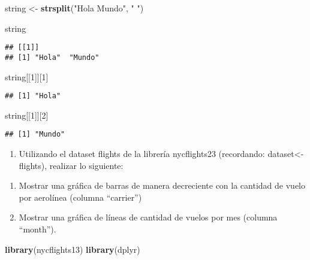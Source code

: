 \documentclass[
]{article}
\newenvironment{Shaded}{\begin{snugshade}}{\end{snugshade}}
\newcommand{\DecValTok}[1]{\textcolor[rgb]{0.00,0.00,0.81}{#1}}
\newcommand{\FunctionTok}[1]{\textcolor[rgb]{0.13,0.29,0.53}{\textbf{#1}}}
\newcommand{\NormalTok}[1]{#1}
\newcommand{\OtherTok}[1]{\textcolor[rgb]{0.56,0.35,0.01}{#1}}
\newcommand{\StringTok}[1]{\textcolor[rgb]{0.31,0.60,0.02}{#1}}
\providecommand{\tightlist}{%
  \setlength{\itemsep}{0pt}\setlength{\parskip}{0pt}}
\begin{document}
\begin{Shaded}
\begin{Highlighting}[]
\NormalTok{string }\OtherTok{\textless{}{-}} \FunctionTok{strsplit}\NormalTok{(}\StringTok{"Hola Mundo"}\NormalTok{, }\StringTok{" "}\NormalTok{)}

\NormalTok{string}
\end{Highlighting}
\end{Shaded}

\begin{verbatim}
## [[1]]
## [1] "Hola"  "Mundo"
\end{verbatim}

\begin{Shaded}
\begin{Highlighting}[]
\NormalTok{string[[}\DecValTok{1}\NormalTok{]][}\DecValTok{1}\NormalTok{]}
\end{Highlighting}
\end{Shaded}

\begin{verbatim}
## [1] "Hola"
\end{verbatim}

\begin{Shaded}
\begin{Highlighting}[]
\NormalTok{string[[}\DecValTok{1}\NormalTok{]][}\DecValTok{2}\NormalTok{]}
\end{Highlighting}
\end{Shaded}

\begin{verbatim}
## [1] "Mundo"
\end{verbatim}

\begin{enumerate}
\def\labelenumi{\arabic{enumi}.}
\setcounter{enumi}{6}
\tightlist
\item
  Utilizando el dataset flights de la librería nycflights23 (recordando:
  dataset\textless- flights), realizar lo siguiente:
\end{enumerate}

\begin{enumerate}
\def\labelenumi{\alph{enumi}.}
\tightlist
\item
  Mostrar una gráfica de barras de manera decreciente con la cantidad de
  vuelo por aerolínea (columna ``carrier'')
\item
  Mostrar una gráfica de líneas de cantidad de vuelos por mes (columna
  ``month'').
\end{enumerate}

\begin{Shaded}
\begin{Highlighting}[]
\FunctionTok{library}\NormalTok{(nycflights13)}
\FunctionTok{library}\NormalTok{(dplyr)}
\end{Highlighting}
\end{Shaded}
\end{document}
